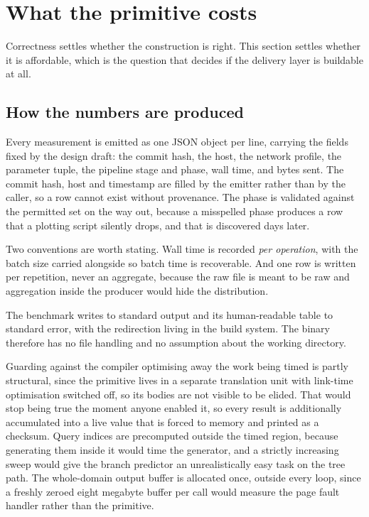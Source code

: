 \section{What the primitive costs}
\label{sec:tech:bench}

Correctness settles whether the construction is right. This section settles
whether it is affordable, which is the question that decides if the delivery
layer is buildable at all.

\subsection{How the numbers are produced}
\label{sec:tech:bench:harness}

Every measurement is emitted as one JSON object per line, carrying the fields
fixed by the design draft: the commit hash, the host, the network profile, the
parameter tuple, the pipeline stage and phase, wall time, and bytes sent. The
commit hash, host and timestamp are filled by the emitter rather than by the
caller, so a row cannot exist without provenance. The phase is validated
against the permitted set on the way out, because a misspelled phase produces a
row that a plotting script silently drops, and that is discovered days later.

Two conventions are worth stating. Wall time is recorded \emph{per operation},
with the batch size carried alongside so batch time is recoverable. And one row
is written per repetition, never an aggregate, because the raw file is meant to
be raw and aggregation inside the producer would hide the distribution.

The benchmark writes to standard output and its human-readable table to
standard error, with the redirection living in the build system. The binary
therefore has no file handling and no assumption about the working directory.

Guarding against the compiler optimising away the work being timed is partly
structural, since the primitive lives in a separate translation unit with
link-time optimisation switched off, so its bodies are not visible to be
elided. That would stop being true the moment anyone enabled it, so every
result is additionally accumulated into a live value that is forced to memory
and printed as a checksum. Query indices are precomputed outside the timed
region, because generating them inside it would time the generator, and a
strictly increasing sweep would give the branch predictor an unrealistically
easy task on the tree path. The whole-domain output buffer is allocated once,
outside every loop, since a freshly zeroed eight megabyte buffer per call would
measure the page fault handler rather than the primitive.

